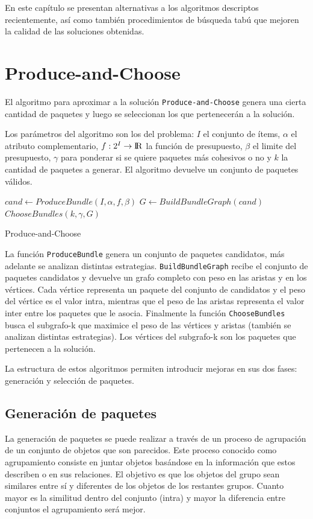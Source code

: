 En este capítulo se presentan alternativas a los algoritmos descriptos recientemente, así como también procedimientos de búsqueda tabú que mejoren la calidad de las soluciones obtenidas.

\section{Produce-and-Choose}
El algoritmo para aproximar a la solución \texttt{Produce-and-Choose} genera una cierta cantidad de paquetes y luego se seleccionan los que pertenecerán a la solución.

Los parámetros del algoritmo son los del problema: $I$ el conjunto de ítems, $\alpha$ el atributo complementario, $f: 2^{I} \rightarrow \rm I \!R$ la función de presupuesto, $\beta$ el limite del presupuesto, $\gamma$ para ponderar si se quiere paquetes más cohesivos o no y $k$ la cantidad de paquetes a generar. El algoritmo devuelve un conjunto de paquetes válidos.

\begin{algorithm}[H]
\DontPrintSemicolon
\SetAlgoLined
	$cand \leftarrow ProduceBundle(I,\alpha,f,\beta)$\;
	$G \leftarrow BuildBundleGraph(cand)$\;
	\Return $ChooseBundles(k,\gamma,G)$\;
\caption{Produce-and-Choose}\label{alg:PAC}
\end{algorithm}

La función \texttt{ProduceBundle} genera un conjunto de paquetes candidatos, más adelante se analizan distintas estrategias. \texttt{BuildBundleGraph} recibe el conjunto de paquetes candidatos y devuelve un grafo completo con peso en las aristas y en los vértices. Cada vértice representa un paquete del conjunto de candidatos y el peso del vértice es el valor intra, mientras que el peso de las aristas representa el valor inter entre los paquetes que le asocia. Finalmente la función \texttt{ChooseBundles} busca el subgrafo-k que maximice el peso de las vértices y aristas (también se analizan distintas estrategias). Los vértices del subgrafo-k son los paquetes que pertenecen a la solución.

La estructura de estos algoritmos permiten introducir mejoras en sus dos fases: generación y selección de paquetes.
\subsection{Generación de paquetes}
La generación de paquetes se puede realizar a través de un proceso de agrupación de un conjunto de objetos que son parecidos. Este proceso conocido como agrupamiento consiste en juntar objetos basándose en la información que estos describen o en sus relaciones. El objetivo es que los objetos del grupo sean similares entre sí y diferentes de los objetos de los restantes grupos. Cuanto mayor es la similitud dentro del conjunto (intra) y mayor la diferencia entre conjuntos el agrupamiento será mejor.

